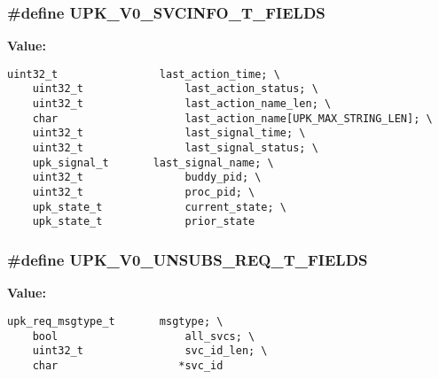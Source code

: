 \subsubsection{\setlength{\rightskip}{0pt plus 5cm}\#define UPK\_\-V0\_\-SVCINFO\_\-T\_\-FIELDS}\label{v0__protocol__structs_8h_dcbe09c6950713c06fd926abcc6dd8a2}


\textbf{Value:}

\begin{Code}\begin{verbatim}uint32_t                last_action_time; \
    uint32_t                last_action_status; \
    uint32_t                last_action_name_len; \
    char                    last_action_name[UPK_MAX_STRING_LEN]; \
    uint32_t                last_signal_time; \
    uint32_t                last_signal_status; \
    upk_signal_t       last_signal_name; \
    uint32_t                buddy_pid; \
    uint32_t                proc_pid; \
    upk_state_t             current_state; \
    upk_state_t             prior_state
\end{verbatim}\end{Code}
\subsubsection{\setlength{\rightskip}{0pt plus 5cm}\#define UPK\_\-V0\_\-UNSUBS\_\-REQ\_\-T\_\-FIELDS}\label{v0__protocol__structs_8h_38cd9e753bddc67a4aa0a538b825b387}


\textbf{Value:}

\begin{Code}\begin{verbatim}upk_req_msgtype_t       msgtype; \
    bool                    all_svcs; \
    uint32_t                svc_id_len; \
    char                   *svc_id
\end{verbatim}\end{Code}
